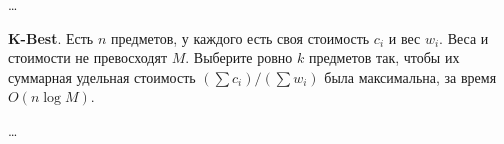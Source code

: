 \begin{solution}
    \dots
\end{solution}


\begin{problem}
    \textbf{K-Best}. Есть $n$ предметов, у каждого есть своя стоимость $c_i$ и вес $w_i$. Веса и стоимости не превосходят $M$.
    Выберите ровно $k$ предметов так, чтобы их суммарная удельная стоимость $\left(\sum c_i\right) / \left(\sum w_i\right)$ была максимальна,
    за время $O(n \log M)$.
\end{problem}


\begin{solution}
    \dots
\end{solution}


\clearpage
